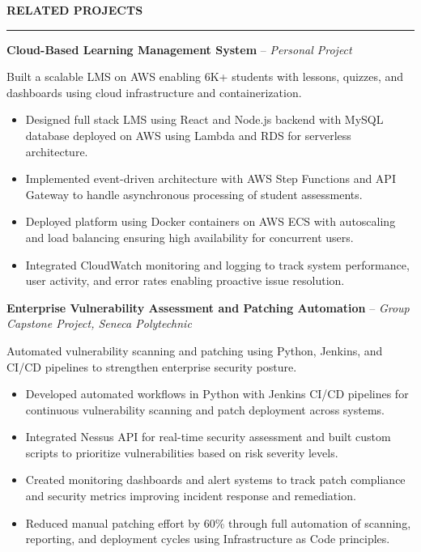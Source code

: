 \documentclass[10pt,letterpaper]{article}
\begin{document}
\vspace{6pt}

\textbf{RELATED PROJECTS}\\[-8pt]
\noindent\rule{\textwidth}{1pt}

\vspace{-2pt}

\textbf{Cloud-Based Learning Management System} -- \emph{Personal Project}

\vspace{-1pt}

Built a scalable LMS on AWS enabling 6K+ students with lessons, quizzes, and dashboards using cloud infrastructure and containerization.
\vspace{-1pt}
\begin{itemize}
\item Designed full stack LMS using React and Node.js backend with MySQL database deployed on AWS using Lambda and RDS for serverless architecture.
\item Implemented event-driven architecture with AWS Step Functions and API Gateway to handle asynchronous processing of student assessments.
\item Deployed platform using Docker containers on AWS ECS with autoscaling and load balancing ensuring high availability for concurrent users.
\item Integrated CloudWatch monitoring and logging to track system performance, user activity, and error rates enabling proactive issue resolution.
\end{itemize}

\textbf{Enterprise Vulnerability Assessment and Patching Automation} -- \emph{Group Capstone Project, Seneca Polytechnic}

\vspace{-1pt}

Automated vulnerability scanning and patching using Python, Jenkins, and CI/CD pipelines to strengthen enterprise security posture.
\vspace{-1pt}
\begin{itemize}
\item Developed automated workflows in Python with Jenkins CI/CD pipelines for continuous vulnerability scanning and patch deployment across systems.
\item Integrated Nessus API for real-time security assessment and built custom scripts to prioritize vulnerabilities based on risk severity levels.
\item Created monitoring dashboards and alert systems to track patch compliance and security metrics improving incident response and remediation.
\item Reduced manual patching effort by 60\% through full automation of scanning, reporting, and deployment cycles using Infrastructure as Code principles.
\end{itemize}
\end{document}

